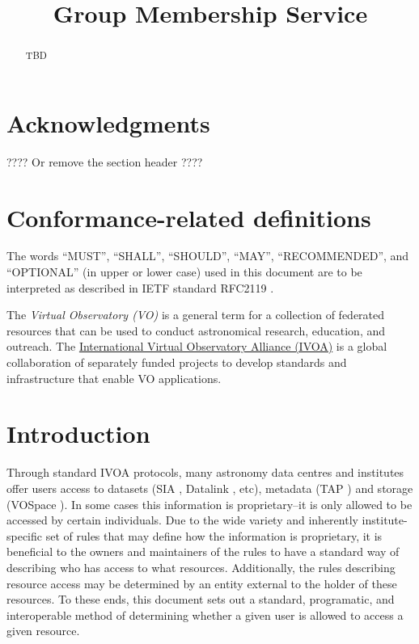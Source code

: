 \documentclass[11pt,a4paper]{ivoa}
\title{Group Membership Service}
\author{}
\author{}
\begin{document}
\begin{abstract}

TBD

\end{abstract}


\section*{Acknowledgments}

???? Or remove the section header ????

\section*{Conformance-related definitions}

The words ``MUST'', ``SHALL'', ``SHOULD'', ``MAY'', ``RECOMMENDED'', and
``OPTIONAL'' (in upper or lower case) used in this document are to be
interpreted as described in IETF standard RFC2119 \citep{std:RFC2119}.

The \emph{Virtual Observatory (VO)} is a
general term for a collection of federated resources that can be used
to conduct astronomical research, education, and outreach.
The \href{http://www.ivoa.net}{International
Virtual Observatory Alliance (IVOA)} is a global
collaboration of separately funded projects to develop standards and
infrastructure that enable VO applications.


\section{Introduction}

Through standard IVOA protocols, many astronomy data centres and institutes offer users access to datasets (SIA \citep{std:SIAP}, Datalink \citep{std:Datalink}, etc), metadata (TAP \citep{std:TAP}) and storage (VOSpace \citep{std:VOSpace}).  In some cases this information is proprietary--it is only allowed to be accessed by certain individuals.  Due to the wide variety and inherently institute-specific set of rules that may define how the information is proprietary, it is beneficial to the owners and maintainers of the rules to have a standard way of describing who has access to what resources.  Additionally, the rules describing resource access may be determined by an entity external to the holder of these resources.  To these ends, this document sets out a standard, programatic, and interoperable method of determining whether a given user is allowed to access a given resource.
\end{document}
